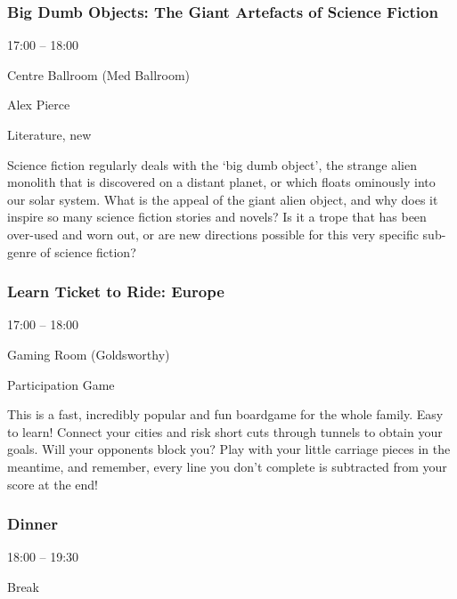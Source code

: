 \documentclass{scrreprt}
\begin{document}
\begin{multicols}{2}
\subsubsection*{Big Dumb Objects: The Giant Artefacts of Science Fiction}\begin{description}
\setlength{\itemsep}{0pt}
\setlength{\parsep}{0pt}
\setlength{\parskip}{0pt}
\item[Time:]{17:00 -- 18:00}
\item[Venue:]{Centre Ballroom (Med Ballroom)}
\item[People:]{Alex Pierce}
\item[Tags:]{Literature, new}\end{description}
Science fiction regularly deals with the ‘big dumb object’, the strange alien monolith that is discovered on a distant planet, or which floats ominously into our solar system. What is the appeal of the giant alien object, and why does it inspire so many science fiction stories and novels? Is it a trope that has been over-used and worn out, or are new directions possible for this very specific sub-genre of science fiction?
\subsubsection*{Learn Ticket to Ride: Europe}\begin{description}
\setlength{\itemsep}{0pt}
\setlength{\parsep}{0pt}
\setlength{\parskip}{0pt}
\item[Time:]{17:00 -- 18:00}
\item[Venue:]{Gaming Room (Goldsworthy)}
\item[Tags:]{Participation Game}\end{description}
This is a fast, incredibly popular and fun boardgame for the whole family. Easy to learn! Connect your cities and risk short cuts through tunnels to obtain your goals. Will your opponents block you? Play with your little carriage pieces in the meantime, and remember, every line you don't complete is subtracted from your score at the end!
\subsubsection*{Dinner}\begin{description}
\setlength{\itemsep}{0pt}
\setlength{\parsep}{0pt}
\setlength{\parskip}{0pt}
\item[Time:]{18:00 -- 19:30}
\item[Tags:]{Break}\end{description}


\end{multicols}
\end{document}
